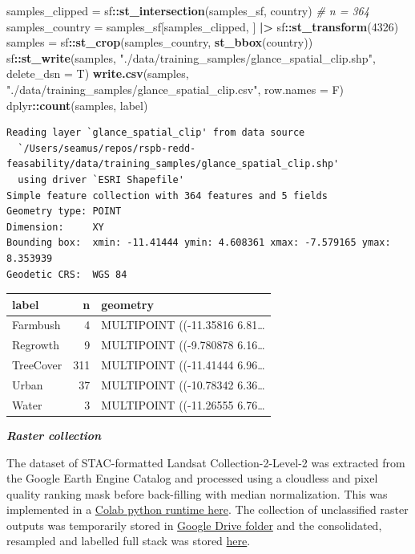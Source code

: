 \documentclass[
]{article}
\newenvironment{Shaded}{\begin{snugshade}}{\end{snugshade}}
\newcommand{\AttributeTok}[1]{\textcolor[rgb]{0.13,0.29,0.53}{#1}}
\newcommand{\CommentTok}[1]{\textcolor[rgb]{0.56,0.35,0.01}{\textit{#1}}}
\newcommand{\DecValTok}[1]{\textcolor[rgb]{0.00,0.00,0.81}{#1}}
\newcommand{\FunctionTok}[1]{\textcolor[rgb]{0.13,0.29,0.53}{\textbf{#1}}}
\newcommand{\NormalTok}[1]{#1}
\newcommand{\OtherTok}[1]{\textcolor[rgb]{0.56,0.35,0.01}{#1}}
\newcommand{\SpecialCharTok}[1]{\textcolor[rgb]{0.81,0.36,0.00}{\textbf{#1}}}
\newcommand{\StringTok}[1]{\textcolor[rgb]{0.31,0.60,0.02}{#1}}
\begin{document}
\begin{Shaded}
\begin{Highlighting}[]
\NormalTok{samples\_clipped  }\OtherTok{=}\NormalTok{ sf}\SpecialCharTok{::}\FunctionTok{st\_intersection}\NormalTok{(samples\_sf, country) }\CommentTok{\# n = 364}
\NormalTok{samples\_country  }\OtherTok{=}\NormalTok{ samples\_sf[samples\_clipped, ] }\SpecialCharTok{|\textgreater{}}\NormalTok{ sf}\SpecialCharTok{::}\FunctionTok{st\_transform}\NormalTok{(}\DecValTok{4326}\NormalTok{)}
\NormalTok{samples          }\OtherTok{=}\NormalTok{ sf}\SpecialCharTok{::}\FunctionTok{st\_crop}\NormalTok{(samples\_country, }\FunctionTok{st\_bbox}\NormalTok{(country))}
\NormalTok{sf}\SpecialCharTok{::}\FunctionTok{st\_write}\NormalTok{(samples, }\StringTok{"./data/training\_samples/glance\_spatial\_clip.shp"}\NormalTok{, }\AttributeTok{delete\_dsn =}\NormalTok{ T)}
\FunctionTok{write.csv}\NormalTok{(samples, }\StringTok{"./data/training\_samples/glance\_spatial\_clip.csv"}\NormalTok{, }\AttributeTok{row.names =}\NormalTok{ F)}
\NormalTok{dplyr}\SpecialCharTok{::}\FunctionTok{count}\NormalTok{(samples, label)}
\end{Highlighting}
\end{Shaded}

\begin{verbatim}
Reading layer `glance_spatial_clip' from data source 
  `/Users/seamus/repos/rspb-redd-feasability/data/training_samples/glance_spatial_clip.shp' 
  using driver `ESRI Shapefile'
Simple feature collection with 364 features and 5 fields
Geometry type: POINT
Dimension:     XY
Bounding box:  xmin: -11.41444 ymin: 4.608361 xmax: -7.579165 ymax: 8.353939
Geodetic CRS:  WGS 84
\end{verbatim}

\begin{longtable}[]{@{}lrl@{}}
\toprule\noalign{}
label & n & geometry \\
\midrule\noalign{}
\endhead
\bottomrule\noalign{}
\endlastfoot
Farmbush & 4 & MULTIPOINT ((-11.35816 6.81\ldots{} \\
Regrowth & 9 & MULTIPOINT ((-9.780878 6.16\ldots{} \\
TreeCover & 311 & MULTIPOINT ((-11.41444 6.96\ldots{} \\
Urban & 37 & MULTIPOINT ((-10.78342 6.36\ldots{} \\
Water & 3 & MULTIPOINT ((-11.26555 6.76\ldots{} \\
\end{longtable}

\textbf{\emph{Raster collection}}

The dataset of STAC-formatted Landsat Collection-2-Level-2 was extracted
from the Google Earth Engine Catalog and processed using a cloudless and
pixel quality ranking mask before back-filling with median
normalization. This was implemented in a
\href{https://drive.google.com/file/d/1Vn0KDzkFDaBhpdC803IbYVRuu5cHx0SO/view?usp=drive_link}{Colab
python runtime here}. The collection of unclassified raster outputs was
temporarily stored in
\href{https://drive.google.com/drive/folders/1XMYYhBUAsvuZ02avsZHYHDTArqztLaFI?usp=drive_link}{Google
Drive folder} and the consolidated, resampled and labelled full stack
was stored
\href{https://drive.google.com/file/d/1Vn0KDzkFDaBhpdC803IbYVRuu5cHx0SO/view?usp=drive_link}{here}.
\end{document}
